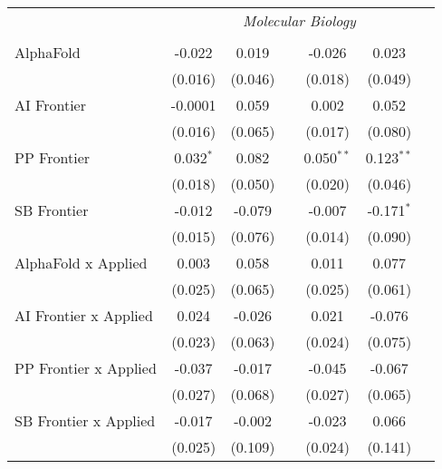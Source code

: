 \begin{tabular}{lcccccc}
 & \multicolumn{6}{c}{\textit{Molecular Biology}} \\ \\
   AlphaFold                      & -0.022      & 0.019   &                & -0.026       & 0.023        &   \\   
                                  & (0.016)     & (0.046) &                & (0.018)      & (0.049)      &   \\   
   AI Frontier                    & -0.0001     & 0.059   &                & 0.002        & 0.052        &   \\   
                                  & (0.016)     & (0.065) &                & (0.017)      & (0.080)      &   \\   
   PP Frontier                    & 0.032$^{*}$ & 0.082   &                & 0.050$^{**}$ & 0.123$^{**}$ &   \\   
                                  & (0.018)     & (0.050) &                & (0.020)      & (0.046)      &   \\   
   SB Frontier                    & -0.012      & -0.079  &                & -0.007       & -0.171$^{*}$ &   \\   
                                  & (0.015)     & (0.076) &                & (0.014)      & (0.090)      &   \\   
   AlphaFold x Applied            & 0.003       & 0.058   &                & 0.011        & 0.077        &   \\   
                                  & (0.025)     & (0.065) &                & (0.025)      & (0.061)      &   \\   
   AI Frontier x Applied          & 0.024       & -0.026  &                & 0.021        & -0.076       &   \\   
                                  & (0.023)     & (0.063) &                & (0.024)      & (0.075)      &   \\   
   PP Frontier x Applied          & -0.037      & -0.017  &                & -0.045       & -0.067       &   \\   
                                  & (0.027)     & (0.068) &                & (0.027)      & (0.065)      &   \\   
   SB Frontier x Applied          & -0.017      & -0.002  &                & -0.023       & 0.066        &   \\   
                                  & (0.025)     & (0.109) &                & (0.024)      & (0.141)      &   \\   

\end{tabular}
